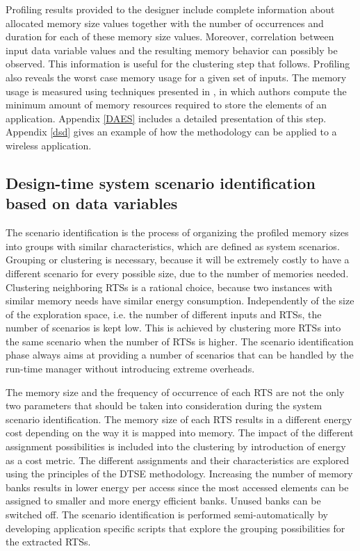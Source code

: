 Profiling results provided to the designer include complete information about allocated memory size values together with the number of occurrences and duration for each of these memory size values. 
Moreover, correlation between input data variable values and the resulting memory behavior can possibly be observed. 
This information is useful for the clustering step that follows. 
Profiling also reveals the worst case memory usage for a given set of inputs. 
The memory usage is measured using techniques presented in \cite{Ang13b}, in which authors compute the minimum amount of memory resources required to store the elements of an application. 
Appendix \ref{DAES} includes a detailed presentation of this step. Appendix \ref{dsd} gives an example of how the methodology can be applied to a wireless application.

\subsection{Design-time system scenario identification based on data variables}

The scenario identification is the process of organizing the profiled memory sizes into groups with similar characteristics, which are defined as system scenarios. 
Grouping or clustering is necessary, because it will be extremely costly to have a different scenario for every possible size, due to the number of memories needed. 
Clustering neighboring RTSs is a rational choice, because two instances with similar memory needs have similar energy consumption. 
Independently of the size of the exploration space, i.e. the number of different inputs and RTSs, the number of scenarios is kept low.
This is achieved by clustering more RTSs into the same scenario when the number of RTSs is higher.
The scenario identification phase always aims at providing a number of scenarios that can be handled by the run-time manager without introducing extreme overheads. 

The memory size and the frequency of occurrence of each RTS are not the only two parameters that should be taken into consideration during the system scenario identification. 
The memory size of each RTS results in a different energy cost depending on the way it is mapped into memory. 
The impact of the different assignment possibilities is included into the clustering by introduction of energy as a cost metric. 
The different assignments and their characteristics are explored using the principles of the DTSE methodology.
Increasing the number of memory banks results in lower energy per access since the most accessed elements can be assigned to smaller and more energy efficient banks. 
Unused banks can be switched off.
The scenario identification is performed semi-automatically by developing application specific scripts that explore the grouping possibilities for the extracted RTSs.

